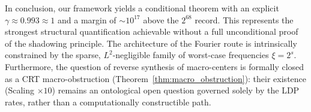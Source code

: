 \documentclass[12pt,a4paper]{article}
\begin{document}
In conclusion, our framework yields a conditional theorem with an explicit $\gamma \approx 0.993 \approx 1$ and a margin of $\sim 10^{17}$ above the $2^{68}$ record. This represents the strongest structural quantification achievable without a full unconditional proof of the shadowing principle. The architecture of the Fourier route is intrinsically constrained by the sparse, $L^2$-negligible family of worst-case frequencies $\xi = 2^s$. Furthermore, the question of reverse synthesis of macro-centers is formally closed as a CRT macro-obstruction (Theorem~\ref{thm:macro_obstruction}): their existence (Scaling $\times10$) remains an ontological open question governed solely by the LDP rates, rather than a computationally constructible path.
\end{document}
